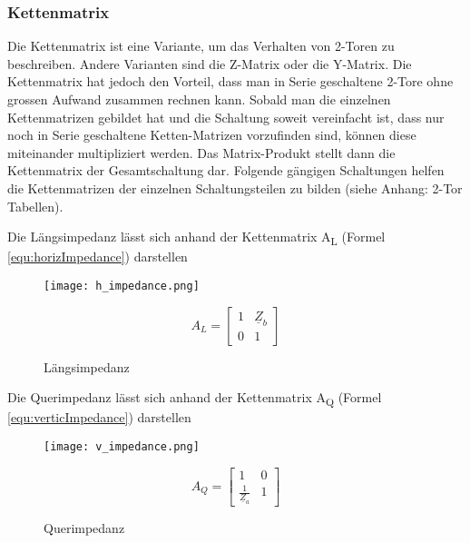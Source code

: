 \subsubsection{Kettenmatrix}\label{subsubsec:kettenmatrix}

Die Kettenmatrix ist eine Variante, um das Verhalten von 2-Toren zu beschreiben. Andere Varianten sind die Z-Matrix oder die Y-Matrix. Die Kettenmatrix hat jedoch den Vorteil, dass man in Serie geschaltene 2-Tore ohne grossen Aufwand zusammen rechnen kann. Sobald man die einzelnen Kettenmatrizen gebildet hat und die Schaltung soweit vereinfacht ist, dass nur noch in Serie geschaltene Ketten-Matrizen vorzufinden sind, können diese miteinander multipliziert werden. Das Matrix-Produkt stellt dann die Kettenmatrix der Gesamtschaltung dar. Folgende gängigen Schaltungen helfen die Kettenmatrizen der einzelnen Schaltungsteilen zu bilden (siehe Anhang: 2-Tor Tabellen).

Die Längsimpedanz lässt sich anhand der Kettenmatrix A\textsubscript{L} (Formel \ref{equ:horizImpedance}) darstellen
\begin{figure}[H]
	\begin{minipage}[h]{0.45\linewidth}
		\centering
		\texttt{[image: h\_impedance.png]}
		\caption{Längsimpedanz}
	\end{minipage}
	\begin{minipage}[h]{0.45\linewidth}
		\centering
		\begin{equation}\label{equ:horizImpedance}
			A_L = \left[\begin{matrix}
			1&\underline{Z}_b\\0&1
			\end{matrix}\right]
		\end{equation}
	\end{minipage}
\end{figure}
Die Querimpedanz lässt sich anhand der Kettenmatrix A\textsubscript{Q} (Formel \ref{equ:verticImpedance}) darstellen
\begin{figure}[H]
	\begin{minipage}[h]{0.45\linewidth}
		\centering
		\texttt{[image: v\_impedance.png]}
		\caption{Querimpedanz}
	\end{minipage}
	\begin{minipage}[h]{0.45\linewidth}
		\centering
		\begin{equation}\label{equ:verticImpedance}
			A_Q = \left[\begin{matrix}
			1&0\\\frac{1}{\underline{Z}_a}&1
			\end{matrix}\right]
		\end{equation}
	\end{minipage}
\end{figure}


